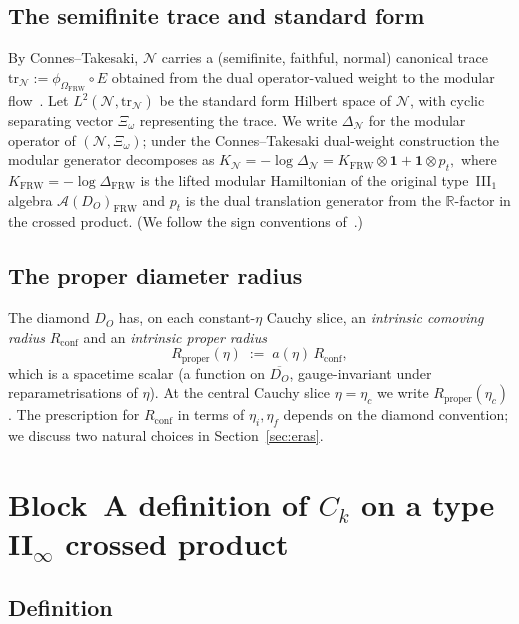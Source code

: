 \documentclass[11pt]{article}
\theoremstyle{definition}
\newcommand{\R}{\mathbb{R}}
\renewcommand{\AA}{\mathcal{A}}
\newcommand{\NN}{\mathcal{N}}
\newcommand{\FRW}{\mathrm{FRW}}
\newcommand{\Rprop}{R_{\mathrm{proper}}}
\newcommand{\Rconf}{R_{\mathrm{conf}}}
\begin{document}
\subsection{The semifinite trace and standard form}

By Connes--Takesaki, $\NN$ carries a (semifinite, faithful, normal)
canonical trace
\(\mathrm{tr}_\NN := \phi_{\Omega_\FRW}\circ E\)
obtained from the dual operator-valued weight to the modular
flow~\cite{Witten2022, CLPW2023}. Let
$L^2(\NN, \mathrm{tr}_\NN)$ be the standard form Hilbert space of
$\NN$, with cyclic separating vector $\Xi_\omega$ representing the
trace. We write $\Delta_\NN$ for the modular operator of
$(\NN, \Xi_\omega)$; under the Connes--Takesaki dual-weight
construction the modular generator decomposes as
\(K_\NN = -\log\Delta_\NN = K_\FRW \otimes \mathbf{1} + \mathbf{1}\otimes p_t,\)
where $K_\FRW = -\log\Delta_\FRW$ is the lifted modular Hamiltonian
of the original type~III$_1$ algebra $\AA(D_O)_\FRW$ and $p_t$ is
the dual translation generator from the $\R$-factor in the crossed
product. (We follow the sign conventions of~\cite{CLPW2023, Witten2022}.)

\subsection{The proper diameter radius}

The diamond $D_O$ has, on each constant-$\eta$ Cauchy slice, an
\emph{intrinsic comoving radius} $\Rconf$ and an \emph{intrinsic
proper radius}
\begin{equation}\label{eq:Rproper}
\Rprop(\eta) \;:=\; a(\eta)\,\Rconf,
\end{equation}
which is a spacetime scalar (a function on $\overline{D_O}$,
gauge-invariant under reparametrisations of $\eta$). At the central
Cauchy slice $\eta = \eta_c$ we write $\Rprop(\eta_c)$. The
prescription for $\Rconf$ in terms of $\eta_i, \eta_f$ depends on
the diamond convention; we discuss two natural choices in
Section~\ref{sec:eras}.

\section{Block~A definition of \texorpdfstring{$C_k$}{C\_k} on a type \texorpdfstring{II$_\infty$}{II-infty} crossed product}\label{sec:blockA}

\subsection{Definition}
\end{document}
